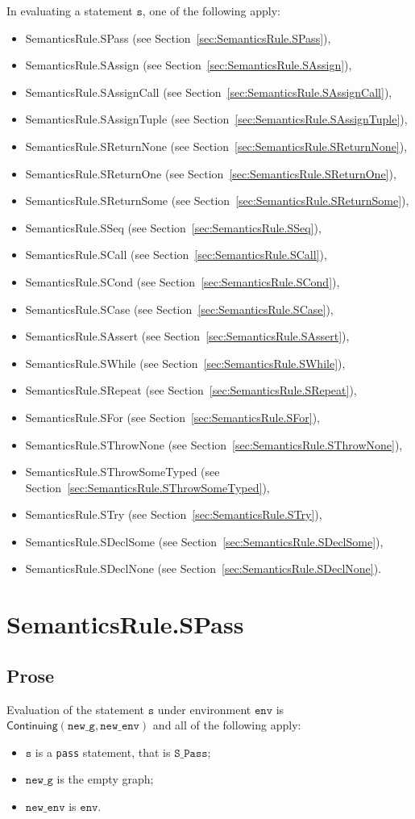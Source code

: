 \documentclass{book}
\newcommand\secref[1]{Section~\ref{sec:#1}}
\newcommand\Continuing[0]{\textsf{Continuing}}
\newcommand\newenv[0]{\texttt{new\_env}}
\newcommand\env[0]{\texttt{env}}
\newcommand\newg[0]{\texttt{new\_g}}
\newcommand\vs[0]{\texttt{s}}
\begin{document}
In evaluating a statement $\vs$, one of the following apply:
\begin{itemize}
\item SemanticsRule.SPass (see \secref{SemanticsRule.SPass}),
\item SemanticsRule.SAssign (see \secref{SemanticsRule.SAssign}),
\item SemanticsRule.SAssignCall (see \secref{SemanticsRule.SAssignCall}),
\item SemanticsRule.SAssignTuple (see \secref{SemanticsRule.SAssignTuple}),
\item SemanticsRule.SReturnNone (see \secref{SemanticsRule.SReturnNone}),
\item SemanticsRule.SReturnOne (see \secref{SemanticsRule.SReturnOne}),
\item SemanticsRule.SReturnSome (see \secref{SemanticsRule.SReturnSome}),
\item SemanticsRule.SSeq (see \secref{SemanticsRule.SSeq}),
\item SemanticsRule.SCall (see \secref{SemanticsRule.SCall}),
\item SemanticsRule.SCond (see \secref{SemanticsRule.SCond}),
\item SemanticsRule.SCase (see \secref{SemanticsRule.SCase}),
\item SemanticsRule.SAssert (see \secref{SemanticsRule.SAssert}),
\item SemanticsRule.SWhile (see \secref{SemanticsRule.SWhile}),
\item SemanticsRule.SRepeat (see \secref{SemanticsRule.SRepeat}),
\item SemanticsRule.SFor (see \secref{SemanticsRule.SFor}),
\item SemanticsRule.SThrowNone (see \secref{SemanticsRule.SThrowNone}),
\item SemanticsRule.SThrowSomeTyped (see \secref{SemanticsRule.SThrowSomeTyped}),
\item SemanticsRule.STry (see \secref{SemanticsRule.STry}),
\item SemanticsRule.SDeclSome (see \secref{SemanticsRule.SDeclSome}),
\item SemanticsRule.SDeclNone (see \secref{SemanticsRule.SDeclNone}).
\end{itemize}

\section{SemanticsRule.SPass \label{sec:SemanticsRule.SPass}}
  \subsection{Prose}
  Evaluation of the statement $\vs$ under environment $\env$ is \\
  $\Continuing(\newg, \newenv)$ and all of the following apply:
  \begin{itemize}
  \item $\vs$ is a \texttt{pass} statement, that is $\texttt{S\_Pass}$;
  \item $\newg$ is the empty graph;
  \item $\newenv$ is $\env$.
  \end{itemize}
\end{document}
